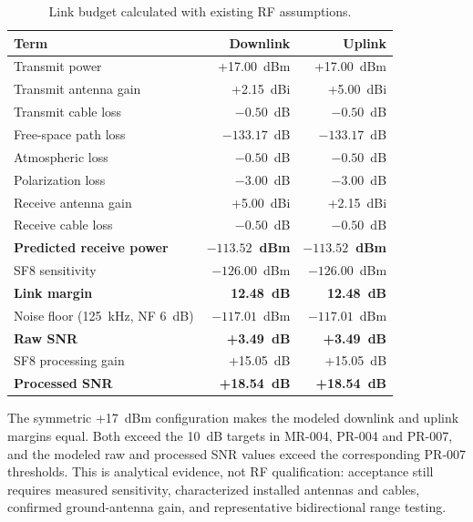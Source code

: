 \begin{table}[H]
\centering
\begin{tabular}{lrr}
\toprule
\textbf{Term} & \textbf{Downlink} & \textbf{Uplink} \\
\midrule
Transmit power & +17.00~dBm & +17.00~dBm \\
Transmit antenna gain & +2.15~dBi & +5.00~dBi \\
Transmit cable loss & $-0.50$~dB & $-0.50$~dB \\
Free-space path loss & $-133.17$~dB & $-133.17$~dB \\
Atmospheric loss & $-0.50$~dB & $-0.50$~dB \\
Polarization loss & $-3.00$~dB & $-3.00$~dB \\
Receive antenna gain & +5.00~dBi & +2.15~dBi \\
Receive cable loss & $-0.50$~dB & $-0.50$~dB \\
\textbf{Predicted receive power} & \textbf{$-113.52$~dBm} & \textbf{$-113.52$~dBm} \\
SF8 sensitivity & $-126.00$~dBm & $-126.00$~dBm \\
\textbf{Link margin} & \textbf{12.48~dB} & \textbf{12.48~dB} \\
Noise floor (125~kHz, NF 6~dB) & $-117.01$~dBm & $-117.01$~dBm \\
\textbf{Raw SNR} & \textbf{+3.49~dB} & \textbf{+3.49~dB} \\
SF8 processing gain & +15.05~dB & +15.05~dB \\
\textbf{Processed SNR} & \textbf{+18.54~dB} & \textbf{+18.54~dB} \\
\bottomrule
\end{tabular}
\caption{Link budget calculated with existing RF assumptions.}
\label{tab:ttc-link-budget}
\end{table}

The symmetric +17~dBm configuration makes the modeled downlink and uplink
margins equal. Both exceed the 10~dB targets in MR-004, PR-004 and PR-007, and
the modeled raw and processed SNR values exceed the corresponding PR-007
thresholds. This is analytical evidence, not RF qualification: acceptance still
requires measured sensitivity, characterized installed antennas and cables,
confirmed ground-antenna gain, and representative bidirectional range testing.

